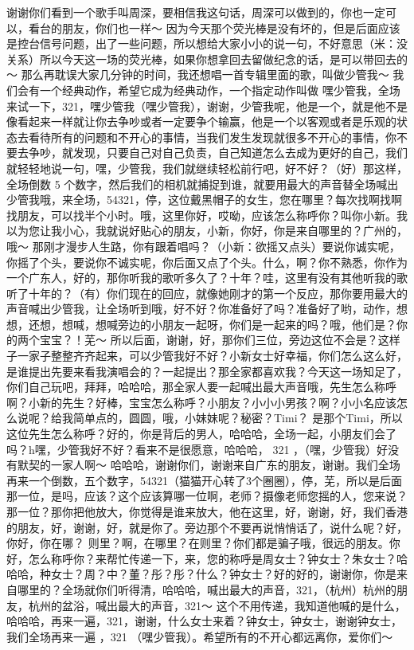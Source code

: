 \documentclass[
]{book}
\begin{document}
谢谢你们看到一个歌手叫周深，要相信我这句话，周深可以做到的，你也一定可以，看台的朋友，你们也一样～ 因为今天那个荧光棒是没有坏的，但是后面应该是控台信号问题，出了一些问题，所以想给大家小小的说一句，不好意思（米：没关系）所以今天这一场的荧光棒，如果你想拿回去留做纪念的话，是可以带回去的～ 那么再耽误大家几分钟的时间，我还想唱一首专辑里面的歌，叫做少管我～ 我们会有一个经典动作，希望它成为经典动作，一个指定动作叫做 嘿少管我，全场来试一下，321，嘿少管我（嘿少管我），谢谢，少管我呢，他是一个，就是他不是像看起来一样就让你去争吵或者一定要争个输赢，他是一个以客观或者是乐观的状态去看待所有的问题和不开心的事情，当我们发生发现就很多不开心的事情，你不要去争吵，就发现，只要自己对自己负责，自己知道怎么去成为更好的自己，我们就轻轻地说一句，嘿，少管我，我们就继续轻松前行吧，好不好？（好）那这样，全场倒数 5 个数字，然后我们的相机就捕捉到谁，就要用最大的声音替全场喊出少管我哦，来全场，54321，停，这位戴黑帽子的女生，您在哪里？每次找啊找啊找朋友，可以找半个小时。哦，这里你好，哎呦，应该怎么称呼你？叫你小新。我以为您让我小心，我就说好贴心的朋友，小新，你好，你是来自哪里的？广州的，哦～ 那刚才漫步人生路，你有跟着唱吗？（小新：欲摇又点头）要说你诚实呢，你摇了个头，要说你不诚实呢，你后面又点了个头。什么，啊？你不熟悉，你作为一个广东人，好的，那你听我的歌听多久了？十年？哇，这里有没有其他听我的歌听了十年的？（有）你们现在的回应，就像她刚才的第一个反应，那你要用最大的声音喊出少管我，让全场听到哦，好不好？你准备好了吗？准备好了哟，动作，想想，还想，想喊，想喊旁边的小朋友一起呀，你们是一起来的吗？哦，他们是？你的两个宝宝？！芜～ 所以后面，谢谢，好，那你们三位，旁边这位不会是？这样子一家子整整齐齐起来，可以少管我好不好？小新女士好幸福，你们怎么这么好，是谁提出先要来看我演唱会的？一起提出？那全家都喜欢我？今天这一场知足了，你们自己玩吧，拜拜，哈哈哈，那全家人要一起喊出最大声音哦，先生怎么称呼啊？小新的先生？好棒，宝宝怎么称呼？小朋友？小小小男孩？啊？小小名应该怎么说呢？给我简单点的，圆圆，哦，小妹妹呢？秘密？Timi？ 是那个Timi，所以这位先生怎么称呼？好的，你是背后的男人，哈哈哈，全场一起，小朋友们会了吗？h嘿，少管我好不好？看来不是很愿意，哈哈哈， 321 ，（嘿，少管我）好没有默契的一家人啊～ 哈哈哈，谢谢你们，谢谢来自广东的朋友，谢谢。我们全场再来一个倒数，五个数字，54321（猫猫开心转了3个圈圈），停，芜，所以是后面那一位，是吗，应该？这个应该算哪一位啊，老师？摄像老师您摇的人，您来说？那一位？那你把他放大，你觉得是谁来放大，他在这里，好，谢谢，好，我们香港的朋友，好，谢谢，好，就是你了。旁边那个不要再说悄悄话了，说什么呢？好，你好，你在哪？ 则里？啊，在哪里？在则里？你们都是骗子哦，很远的朋友。你好，怎么称呼你？来帮忙传递一下，来，您的称呼是周女士？钟女士？朱女士？哈哈哈，种女士？周？中？董？彤？彤？什么？钟女士？好的好的，谢谢你，你是来自哪里的？全场就你们听得清，哈哈哈，喊出最大的声音，321，（杭州）杭州的朋友，杭州的盆浴，喊出最大的声音，321～ 这个不用传递，我知道他喊的是什么，哈哈哈，再来一遍，321，谢谢，什么女士来着？钟女士，钟女士，谢谢钟女士，我们全场再来一遍 ，321 （嘿少管我）。希望所有的不开心都远离你，爱你们～
\end{document}
